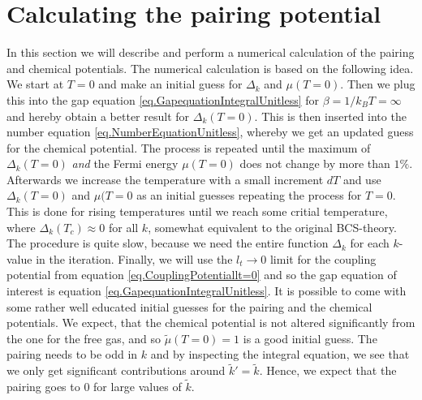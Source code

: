 \section{Calculating the pairing potential} \label{sec.pairingandchemicalpotential.numericalcalculation}
In this section we will describe and perform a numerical calculation of the pairing and chemical potentials. The numerical calculation is based on the following idea. We start at $T=0$ and make an initial guess for $\Delta_k$ and $\mu(T=0)$. Then we plug this into the gap equation \eqref{eq.GapequationIntegralUnitless} for $\beta = 1/k_BT = \infty$ and hereby obtain a better result for $\Delta_k(T=0)$. This is then inserted into the number equation \eqref{eq.NumberEquationUnitless}, whereby we get an updated guess for the chemical potential. The process is repeated until the maximum of $\Delta_k(T=0)$ \textit{and} the Fermi energy $\mu(T=0)$ does not change by more than $1\%$. Afterwards we increase the temperature with a small increment $dT$ and use $\Delta_k(T=0)$ and $\mu(T=0$ as an initial guesses repeating the process for $T=0$. This is done for rising temperatures until we reach some critial temperature, where $\Delta_k(T_c)\approx 0$ for all $k$, somewhat equivalent to the original BCS-theory\cite{Tinkham,LandauStatPhys2,PlischkeStatPhys}. The procedure is quite slow, because we need the entire function $\Delta_k$ for each $k$-value in the iteration. Finally, we will use the $l_t \to 0$ limit for the coupling potential from equation \eqref{eq.CouplingPotentiallt=0} and so the gap equation of interest is equation \eqref{eq.GapequationIntegralUnitless}. It is possible to come with some rather well educated initial guesses for the pairing and the chemical potentials. We expect, that the chemical potential is not altered significantly from the one for the free gas, and so $\tilde{\mu}(T = 0) = 1$ is a good initial guess. The pairing needs to be odd in $k$ and by inspecting the integral equation, we see that we only get significant contributions around $\tilde{k}' = \tilde{k}$. Hence, we expect that the pairing goes to 0 for large values of $\tilde{k}$.  

